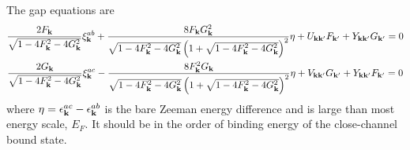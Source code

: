 The gap equations are 
\begin{subequations}\label{eq:20100909:fullgap}
\begin{gather}
\frac{2F_{\mathbf{k}}}{\sqrt{1-4 F_{\mathbf{k}}^2-4 G_{\mathbf{k}}^2}} \xi^{ab}_{\mathbf{k}}+\frac{8 F_{\mathbf{k}} G_{\mathbf{k}}^2}{\sqrt{1-4 F_{\mathbf{k}}^2-4 G_{\mathbf{k}}^2} \left(1+\sqrt{1-4 F_{\mathbf{k}}^2-4 G_{\mathbf{k}}^2}\right)^2}\eta+U_{\mathbf{k}\mathbf{k}'}F_{\mathbf{k}'}+Y_{\mathbf{k}\mathbf{k}'}G_{\mathbf{k}'}=0
\label{eq:20100909:fullgapa}\\
\frac{2G_{\mathbf{k}}}{\sqrt{1-4 F_{\mathbf{k}}^2-4 G_{\mathbf{k}}^2}} \xi^{ac}_{\mathbf{k}}-\frac{8 F_{\mathbf{k}}^{2} G_{\mathbf{k}}}{\sqrt{1-4 F_{\mathbf{k}}^2-4 G_{\mathbf{k}}^2} \left(1+\sqrt{1-4 F_{\mathbf{k}}^2-4 G_{\mathbf{k}}^2}\right)^2}\eta+V_{\mathbf{k}\mathbf{k}'}G_{\mathbf{k}'}+Y_{\mathbf{k}\mathbf{k}'}F_{\mathbf{k}'}=0
\label{eq:20100909:fullgapb}
\end{gather}
\end{subequations}
where $\eta=\epsilon^{ac}_{\mathbf{k}}-\epsilon^{ab}_{\mathbf{k}}$ is the bare Zeeman energy difference and is large than most energy scale, $E_{F}$.  It should be in the order of binding energy of the close-channel bound state.    
